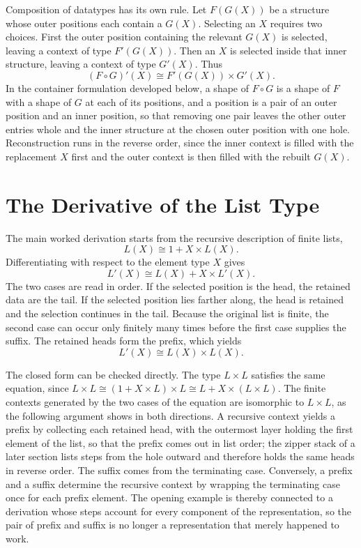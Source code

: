 \documentclass[11pt]{article}
\begin{document}
Composition of datatypes has its own rule. Let $F(G(X))$ be a structure whose outer positions each contain a $G(X)$. Selecting an $X$ requires two choices. First the outer position containing the relevant $G(X)$ is selected, leaving a context of type $F'(G(X))$. Then an $X$ is selected inside that inner structure, leaving a context of type $G'(X)$. Thus
\[
(F\circ G)'(X)\cong F'(G(X))\times G'(X).
\]
In the container formulation developed below, a shape of $F\circ G$ is a shape of $F$ with a shape of $G$ at each of its positions, and a position is a pair of an outer position and an inner position, so that removing one pair leaves the other outer entries whole and the inner structure at the chosen outer position with one hole. Reconstruction runs in the reverse order, since the inner context is filled with the replacement $X$ first and the outer context is then filled with the rebuilt $G(X)$.

\section{The Derivative of the List Type}

The main worked derivation starts from the recursive description of finite lists,
\[
L(X)\cong 1+X\times L(X).
\]
Differentiating with respect to the element type $X$ gives
\[
L'(X)\cong L(X)+X\times L'(X).
\]
The two cases are read in order. If the selected position is the head, the retained data are the tail. If the selected position lies farther along, the head is retained and the selection continues in the tail. Because the original list is finite, the second case can occur only finitely many times before the first case supplies the suffix. The retained heads form the prefix, which yields
\[
L'(X)\cong L(X)\times L(X).
\]

The closed form can be checked directly. The type $L\times L$ satisfies the same equation, since $L\times L\cong(1+X\times L)\times L\cong L+X\times(L\times L)$. The finite contexts generated by the two cases of the equation are isomorphic to $L\times L$, as the following argument shows in both directions. A recursive context yields a prefix by collecting each retained head, with the outermost layer holding the first element of the list, so that the prefix comes out in list order; the zipper stack of a later section lists steps from the hole outward and therefore holds the same heads in reverse order. The suffix comes from the terminating case. Conversely, a prefix and a suffix determine the recursive context by wrapping the terminating case once for each prefix element. The opening example is thereby connected to a derivation whose steps account for every component of the representation, so the pair of prefix and suffix is no longer a representation that merely happened to work.
\end{document}
